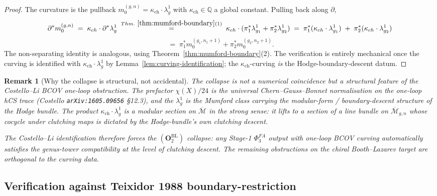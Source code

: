 \documentclass[11pt]{amsart}
\newtheorem{remark}[theorem]{Remark}
\newcommand{\kch}{\kappa_{\mathrm{ch}}}
\newcommand{\Mbar}{\overline{\mathcal{M}}}
\newcommand{\bQ}{\mathbb{Q}}
\begin{document}
\begin{proof}
The curvature is the pullback $m_0^{(g,n)} = \kch \cdot \lambda_g^1$
with $\kch \in \bQ$ a global constant. Pulling back along
$\partial$,
\[
\partial^* m_0^{(g,n)} \;=\; \kch \cdot \partial^* \lambda_g^1
\;\stackrel{\mathrm{Thm.}\ \ref{thm:mumford-boundary}(1)}{=}\;
\kch \cdot (\pi_1^* \lambda_{g_1}^1 + \pi_2^* \lambda_{g_2}^1)
\;=\; \pi_1^* (\kch \cdot \lambda_{g_1}^1)
\;+\; \pi_2^* (\kch \cdot \lambda_{g_2}^1)
\]
\[
\;=\; \pi_1^* m_0^{(g_1, n_1+1)} + \pi_2^* m_0^{(g_2, n_2+1)}.
\]
The non-separating identity is analogous, using
Theorem~\ref{thm:mumford-boundary}(2). The verification is
entirely mechanical once the curving is identified with
$\kch \cdot \lambda_g^1$ by Lemma~\ref{lem:curving-identification};
the $\kch$-curving \emph{is} the Hodge-boundary-descent datum.
\end{proof}

\begin{remark}[Why the collapse is structural, not accidental]
\label{rem:collapse-structural}
The collapse is not a numerical coincidence but a structural
feature of the Costello--Li BCOV one-loop obstruction. The
prefactor $\chi(X)/24$ is the universal Chern--Gauss--Bonnet
normalisation on the one-loop hCS trace (Costello
\texttt{arXiv:1605.09656} \S 12.3), and the $\lambda_g^1$ is the
Mumford class carrying the modular-form / boundary-descent structure
of the Hodge bundle. The product $\kch \cdot \lambda_g^1$ is a
\emph{modular section} on $\Mbar$ in the strong sense: it lifts
to a section of a line bundle on $\Mbar_{g,n}$ whose cocycle under
clutching maps is dictated by the Hodge-bundle's own clutching
descent.

The Costello--Li identification therefore \emph{forces} the
$(\mathbf{O}_2^{\mathrm{BL}})$ collapse: any Stage-1 $\Phi^{FA}_3$
output with one-loop BCOV curving automatically satisfies the
genus-tower compatibility at the level of clutching descent. The
remaining obstructions on the chiral Booth--Lazarev target are
orthogonal to the curving data.
\end{remark}

\subsection{Verification against Teixidor 1988 boundary-restriction}
\end{document}
